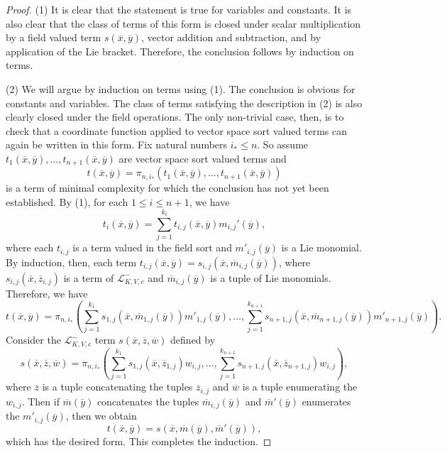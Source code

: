 \documentclass[psamsfonts]{amsart}
\theoremstyle{definition}
\theoremstyle{definition}
\theoremstyle{remark}
\numberwithin{equation}{section}
\newcommand\LL{\mathscr{L}}
\begin{document}
\begin{proof}
(1)  It is clear that the statement is true for variables and constants.  It is also clear that the class of terms of this form is closed under scalar multiplication by a field valued term $s(\overline{x},\overline{y})$, vector addition and subtraction, and by application of the Lie bracket.  Therefore, the conclusion follows by induction on terms.

(2) We will argue by induction on terms using (1).  The conclusion is obvious for constants and variables.  The class of terms satisfying the description in (2) is also clearly closed under the field operations.  The only non-trivial case, then, is to check that a coordinate function applied to vector space sort valued terms can again be written in this form.  Fix natural numbers $i_{*} \leq n$. So assume $t_{1}(\overline{x},\overline{y}), \ldots, t_{n+1}(\overline{x},\overline{y})$ are vector space sort valued terms and 
$$
t(\overline{x},\overline{y}) = \pi_{n,i_{*}}(t_{1}(\overline{x},\overline{y}), \ldots, t_{n+1}(\overline{x},\overline{y}))
$$
is a term of minimal complexity for which the conclusion has not yet been established. By (1), for each $1 \leq i \leq n+1$, we have
$$
t_{i}(\overline{x},\overline{y}) = \sum_{j = 1}^{k_{i}} t_{i,j}(\overline{x},\overline{y})m_{i,j}'(\overline{y}),
$$
where each $t_{i,j}$ is a term valued in the field sort and $m'_{i,j}(\overline{y})$ is a Lie monomial. By induction, then, each term $t_{i,j}(\overline{x},\overline{y}) = s_{i,j}(\overline{x}, \overline{m}_{i,j}(\overline{y}))$, where $s_{i,j}(\overline{x},\overline{z}_{i,j})$ is a term of $\LL_{K,V,c}^{-}$ and $\overline{m}_{i,j}(\overline{y})$ is a tuple of Lie monomials.  Therefore, we have
$$
t(\overline{x},\overline{y}) = \pi_{n,i_{*}}\left( \sum_{j = 1}^{k_{1}} s_{1,j}(\overline{x},\overline{m}_{1,j}(\overline{y}))m'_{1,j}(\overline{y}), \ldots, \sum_{j = 1}^{k_{n+1}} s_{n+1,j} (\overline{x},\overline{m}_{n+1,j}(\overline{y}))m'_{n+1,j}(\overline{y})\right).
$$
Consider the $\LL_{K,V,c}^{-}$ term $s(\overline{x},\overline{z},\overline{w})$ defined by 
$$
s(\overline{x},\overline{z},\overline{w}) = \pi_{n,i_{*}}\left( \sum_{j = 1}^{k_{1}} s_{1,j}(\overline{x},\overline{z}_{1,j})w_{i,j}, \ldots, \sum_{j = 1}^{k_{n+1}} s_{n+1,j} (\overline{x},\overline{z}_{n+1,j})w_{i,j}\right),
$$
where $\overline{z}$ is a tuple concatenating the tuples $\overline{z}_{i,j}$ and $\overline{w}$ is a tuple enumerating the $w_{i,j}$. Then if $\overline{m}(\overline{y})$ concatenates the tuples $\overline{m}_{i,j}(\overline{y})$ and $\overline{m}'(\overline{y})$ enumerates the $m'_{i,j}(\overline{y})$, then we obtain 
$$
t(\overline{x},\overline{y}) = s(\overline{x},\overline{m}(\overline{y}),\overline{m}'(\overline{y})),
$$
which has the desired form.  This completes the induction. 
\end{proof}
\end{document}
